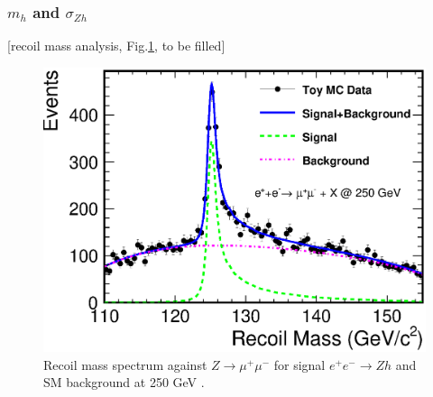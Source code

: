 \subsubsection{$m_h$ and $\sigma_{Zh}$}
[recoil mass analysis, Fig.\ref{fig:RecoilMassLep250}, to be filled]
\begin{figure}
\begin{center}
\includegraphics[width=0.85\hsize]{chapters/figures/RecoilMassLep250.eps}
\end{center}
  \caption{Recoil mass spectrum against
 $Z\to\mu^+\mu^-$ for signal $e^+e^-\to Zh$ and SM background 
  at 250 GeV \cite{Yan:2016xyx}.}
  \label{fig:RecoilMassLep250}
\end{figure}

